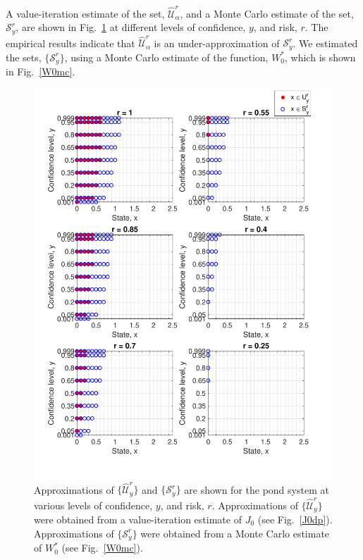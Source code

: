 \documentclass[letterpaper, 10 pt, conference]{ieeeconf}  %
\begin{document}
A value-iteration estimate of the set, $\widehat{\mathcal{U}}_{\alpha}^r$, and a Monte Carlo estimate of the set, $\mathcal{S}_y^r$, are shown in Fig.~\ref{compare}
at different levels of confidence, $y$, and risk, $r$. 
The empirical results indicate that $\widehat{\mathcal{U}}_{\alpha}^r$ is an under-approximation of $\mathcal{S}_y^r$.
We estimated the sets, $\{\mathcal{S}_y^r\}$, using a Monte Carlo estimate of the function, $W_0^*$, which is shown in Fig.~\ref{W0mc}.

\begin{figure}[thpb]
      \centering
      \includegraphics[scale=0.5]{output_CompareScript_Sept112018.pdf}
      \caption{ Approximations of $\{\widehat{\mathcal{U}}_y^r\}$ and $\{\mathcal{S}_y^r\}$ are shown for the pond system at various levels of confidence, $y$, and risk, $r$.
	  Approximations of $\{\widehat{\mathcal{U}}_y^r\}$ were obtained from a value-iteration estimate of $J_0$ (see Fig.~\ref{J0dp}).
	  Approximations of $\{\mathcal{S}_y^r\}$ were obtained from a Monte Carlo estimate of $W_0^*$ (see Fig.~\ref{W0mc}).} 
      \label{compare}
\end{figure}
\end{document}
